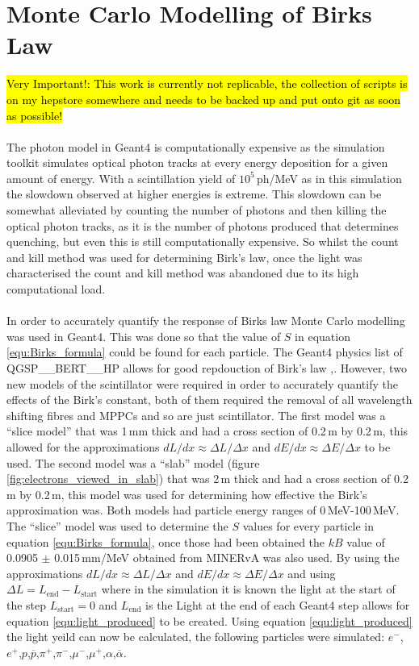 \section{Monte Carlo Modelling of Birks Law}\label{sec:geant4Simulation_MonteCarloBirksLaw}
\hl{Very Important!: This work is currently not replicable, the collection of scripts is on my hepstore somewhere and needs to be backed up and put onto git as soon as possible!}
\\\\The photon model in Geant4 is computationally expensive as the simulation toolkit simulates optical photon tracks at every energy deposition for a given amount of energy. With a scintillation yield of $10^5$\,ph/MeV as in this simulation the slowdown observed at higher energies is extreme. This slowdown can be somewhat alleviated by counting the number of photons and then killing the optical photon tracks, as it is the number of photons produced that determines quenching, but even this is still computationally expensive. So whilst the count and kill method was used for determining Birk's law, once the light was characterised the count and kill method was abandoned due to its high computational load.
\\\\In order to accurately quantify the response of Birks law Monte Carlo modelling was used in Geant4. This was done so that the value of $S$ in equation \ref{equ:Birks_formula} could be found for each particle. The Geant4 physics list of QGSP\_\_BERT\_\_HP allows for good repdouction of Birk's law \cite{Patrick_2018},\cite{aliaga_2015}. However, two new models of the scintillator were required in order to accurately quantify the effects of the Birk's constant, both of them required the removal of all wavelength shifting fibres and MPPCs and so are just scintillator. The first model was a ``slice model'' that was 1\,mm thick and had a cross section of 0.2\,m by 0.2\,m, this allowed for the approximations $dL/dx \approx \Delta L / \Delta x$ and $dE/dx \approx \Delta E / \Delta x$ to be used. The second model was a ``slab'' model (figure \ref{fig:electrons_viewed_in_slab}) that was 2\,m thick and had a cross section of 0.2\,m by 0.2\,m, this model was used for determining how effective the Birk's approximation was. Both models had particle energy ranges of 0\,MeV-100\,MeV.
The ``slice'' model was used to determine the $S$ values for every particle in equation \ref{equ:Birks_formula}, once those had been obtained the $kB$ value of 0.0905 $\pm$ 0.015\,mm/MeV obtained from MINERvA was also used. By using the approximations $dL/dx \approx \Delta L / \Delta x$ and $dE/dx \approx \Delta E / \Delta x$ and using $\Delta L = L_{\textrm{end}} - L_{\textrm{start}} $ where in the simulation it is known the light at the start of the step $L_{\textrm{start}} = 0$ and $L_{\textrm{end}}$ is the Light at the end of each Geant4 step allows for equation \ref{equ:light_produced} to be created. Using equation \ref{equ:light_produced} the light yeild can now be calculated, the following particles were simulated: $e^-$,$e^+$,$p$,$\overline{p}$,$\pi^+$,$\pi^-$,$\mu^-$,$\mu^+$,$\alpha$,$\overline{\alpha}$. 
